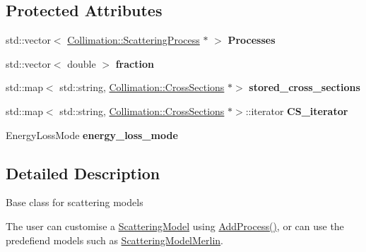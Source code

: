 \subsection*{Protected Attributes}
\begin{DoxyCompactItemize}
\item 
\mbox{\label{classCollimation_1_1ScatteringModel_af157546eccacaa7acd89c07d991050c7}} 
std\+::vector$<$ \hyperlink{classCollimation_1_1ScatteringProcess}{Collimation\+::\+Scattering\+Process} $\ast$ $>$ {\bfseries Processes}
\item 
\mbox{\label{classCollimation_1_1ScatteringModel_a609f6307d78e218887cc8bc49d278aed}} 
std\+::vector$<$ double $>$ {\bfseries fraction}
\item 
\mbox{\label{classCollimation_1_1ScatteringModel_a3103f2bcd31c2de405014011635b333d}} 
std\+::map$<$ std\+::string, \hyperlink{classCollimation_1_1CrossSections}{Collimation\+::\+Cross\+Sections} $\ast$$>$ {\bfseries stored\+\_\+cross\+\_\+sections}
\item 
\mbox{\label{classCollimation_1_1ScatteringModel_ab7c63c75caf2610bf007ea92d9cd7237}} 
std\+::map$<$ std\+::string, \hyperlink{classCollimation_1_1CrossSections}{Collimation\+::\+Cross\+Sections} $\ast$$>$\+::iterator {\bfseries C\+S\+\_\+iterator}
\item 
\mbox{\label{classCollimation_1_1ScatteringModel_acf2c0b605b5e37b0768181632d7317b7}} 
Energy\+Loss\+Mode {\bfseries energy\+\_\+loss\+\_\+mode}
\end{DoxyCompactItemize}


\subsection{Detailed Description}
Base class for scattering models

The user can customise a \hyperlink{classCollimation_1_1ScatteringModel}{Scattering\+Model} using \hyperlink{classCollimation_1_1ScatteringModel_a2e670af5fbb3c40a4f294e135f14892b}{Add\+Process()}, or can use the predefiend models such as \hyperlink{classCollimation_1_1ScatteringModelMerlin}{Scattering\+Model\+Merlin}. 

